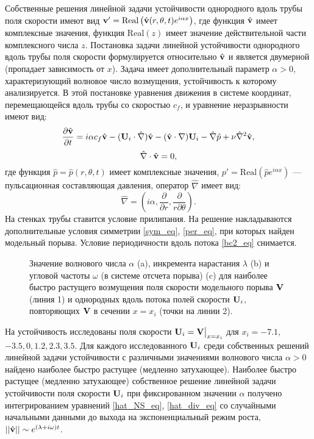 Собственные решения линейной задачи устойчивости однородного вдоль трубы поля скорости имеют вид $\mathbf{v}' = \mathrm{Real}\left(\hat {\mathbf{v}} (r, \theta, t) e^{i \alpha x}\right)$, где функция $\hat {\mathbf{v}}$ имеет комплексные значения, функция $\mathrm{Real}(z)$ имеет значение действительной части комплексного числа $z$. Постановка задачи линейной устойчивости однородного вдоль трубы поля скорости формулируется относительно $\hat {\mathbf{v}}$ и является двумерной (пропадает зависимость от $x$). Задача имеет дополнительный параметр $\alpha > 0$, характеризующий волновое число возмущения, устойчивость к которому анализируется. В этой постановке уравнения движения в системе координат, перемещающейся вдоль трубы со скоростью $c_f$, и уравнение неразрывности имеют вид: 
\begin{equation} \label{hat_NS_eq}
\frac{\partial \hat {\mathbf{v}}}{\partial t} = i \alpha  c_f \hat {\mathbf{v}} - (\mathbf{U}_i \cdot \hat \nabla) \hat {\mathbf{v}} - (\hat {\mathbf{v}} \cdot \nabla) \mathbf{U}_i - \hat \nabla \hat p + \nu \hat \nabla^2 \hat {\mathbf{v}},
\end{equation}
\begin{equation} \label{hat_div_eq}
\hat \nabla \cdot \hat {\mathbf{v}} = 0,
\end{equation}
где функция $\hat p = \hat p(r,\theta,t)$ имеет комплексные значения, $p' = \mathrm{Real}\left(\hat p e^{i \alpha x}\right)$ --- пульсационная составляющая давления, оператор $\hat \nabla$ имеет вид: 
\begin{equation*}
\hat \nabla = \left( i\alpha, \frac{\partial}{\partial r}, \frac{\partial}{r \partial \theta} \right).
\end{equation*}
На стенках трубы ставится условие прилипания. На решение накладываются дополнительные условия симметрии \eqref{sym_eq}, \eqref{per_eq}, при которых найден модельный порыва. Условие периодичности вдоль потока \eqref{bc2_eq} снимается. 

\begin{figure}
\caption{Значение волнового числа $\alpha$ (a), инкремента нарастания $\lambda$ (b) и угловой частоты $\omega$ (в системе отсчета порыва) (c) для наиболее быстро растущего возмущения поля скорости модельного порыва $\mathbf{V}$ (линия 1) и однородных вдоль потока полей скорости $\mathbf{U}_i$, повторяющих $\mathbf{V}$ в сечении $x = x_i$ (точки на линии 2).}
\label{cs_lin_pic}
\end{figure}

На устойчивость исследованы поля скорости $\mathbf{U}_i = \mathbf{V}\big|_{x=x_i}$ для $x_i = -7.1,$ $-3.5, 0, 1.2, 2.3, 3.5$.  Для каждого исследованного $\mathbf{U}_i$ среди собственных решений линейной задачи устойчивости с различными значениями волнового числа $\alpha >0$ найдено наиболее быстро растущее (медленно затухающее). Наиболее быстро растущее (медленно затухающее) собственное решение линейной задачи устойчивости поля скорости $\mathbf{U}_i$ при фиксированном значении $\alpha$ получено интегрированием уравнений \eqref{hat_NS_eq}, \eqref{hat_div_eq} со случайными начальными данными до выхода на экспоненциальный режим роста, $||\hat {\mathbf{v}}|| \sim e^{(\lambda + i\omega) t}$. 

